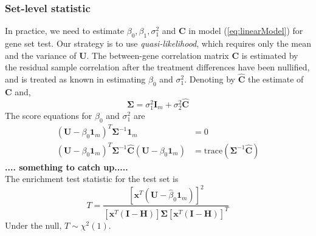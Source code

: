 \documentclass[useAMS,usenatbib, galley]{biom}
\begin{document}
	\subsubsection{Set-level statistic}\label{subsection:setlevelstat}
	In practice, we need to estimate $\beta_0, \beta_1,\sigma_1^2$ and $\bm C$ in model (\ref{eq:linearModel}) for gene set test. Our strategy is to use \textit{quasi-likelihood}, which requires only the mean and the variance of $\bm U$.  The between-gene correlation matrix $\bm C$ is estimated by the residual sample correlation after the treatment differences have been nullified, and is treated as known in estimating $\beta_0$ and $\sigma_1^2$. 
	Denoting by $\hat{\bm C}$ the estimate of $\bm C$ and,
	\begin{equation}\label{eq:estimateparameter}
	\bm\Sigma = \sigma^2_1\bm I_m + \sigma_2^2 \hat{\bm C}
	\end{equation}
	The score equations for $\beta_0$ and $\sigma_1^2$ are
	\begin{equation}
	\begin{aligned}
	(\bm U - \beta_0\bm 1_m)^T \bm \Sigma^{-1}\bm 1_m & = 0\\
	(\bm U - \beta_0\bm 1_m)^T \bm \Sigma^{-1} \hat{\bm C} (\bm U - \beta_0\bm 1_m) &= \text{trace}(\bm \Sigma^{-1}\hat{\bm C})
	\end{aligned}
	\end{equation}
	\textbf{.... something to catch up.....}\\
	The enrichment test statistic for the test set is 
	\begin{equation}\label{eq:teststatistic}
	T = \frac{\left[\bm x^T(\bm U - \hat{\beta}_0 \bm 1_m )\right]^2}{\left[\bm x^T(\bm I - \bm H)\right]\bm \Sigma \left[\bm x^T(\bm I - \bm H)\right]^T}
	\end{equation} 
	Under the null, $T\sim \chi^2(1)$.
	
	
\end{document}

